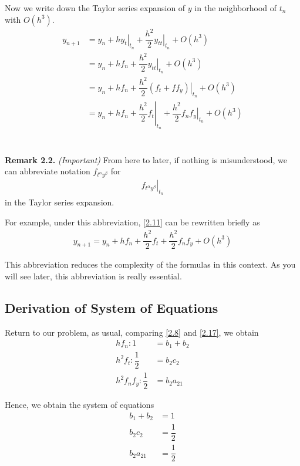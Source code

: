 \documentclass[a4paper,oneside]{book}
\numberwithin{equation}{chapter}
\begin{document}
Now we write down the Taylor series expansion of $y$ in the neighborhood of $t_n$ with $O\left(h^3\right)$.
\begin{align}
{{y_{n + 1}}} &= {{y_n}} + h{\left. {{y_t}} \right|_{{t_n}}} + \dfrac{{{h^2}}}{2}{\left. {{y_{tt}}} \right|_{{t_n}}} + O\left( {{h^3}} \right)\\
 &= {{y_n}} + h{f_n} + \dfrac{{{h^2}}}{2}{\left. {{y_{tt}}} \right|_{{t_n}}} + O\left( {{h^3}} \right)\\
 &= {{y_n}} + h{f_n} + \dfrac{{{h^2}}}{2}{\left. {\left( {{f_t} + f{f_y}} \right)} \right|_{{t_n}}} + O\left( {{h^3}} \right)\\
 &= {{y_n}} + h{f_n} + {\left. {\dfrac{{{h^2}}}{2}{f_t}} \right|_{{t_n}}} + \dfrac{{{h^2}}}{2}{f_n}{\left. {{f_y}} \right|_{{t_n}}} + O\left( {{h^3}} \right)
\label{2.11}
\end{align}\\
\\
\textbf{Remark 2.2.} \textit{(Important)} From here to later, if nothing is misunderstood, we can abbreviate notation ${f_{{t^\alpha }{y^\beta }}}$ for 
\begin{align}
{\left. {{f_{{t^\alpha }{y^\beta }}}} \right|_{{t_n}}}
\end{align}
in the Taylor series expansion.

For example, under this abbreviation, \eqref{2.11} can be rewritten briefly as
\begin{align}
\label{2.17}
{{y_{n + 1}}} = {{y_n}} + h{f_n} + \dfrac{{{h^2}}}{2}{f_t} + \dfrac{{{h^2}}}{2}{f_n}{f_y} + O\left( {{h^3}} \right)
\end{align}

This abbreviation reduces the complexity of the formulas in this context. As you will see later, this abbreviation is really essential.
\subsection{Derivation of System of Equations}
Return to our problem, as usual, comparing \eqref{2.8} and \eqref{2.17}, we obtain
\begin{align}
h{f_n}:1 &= {b_1} + {b_2}\\
{h^2}{f_t}:\dfrac{1}{2} &= {b_2}{c_2}\\
{h^2}{f_n}{f_y}:\dfrac{1}{2} &= {b_2}{a_{21}}
\end{align}

Hence, we obtain the system of equations
\begin{align}
{b_1} + {b_2} &= 1\label{2.21}\\
{b_2}{c_2} &= \dfrac{1}{2}\label{2.22}\\
{b_2}{a_{21}} &= \dfrac{1}{2}\label{2.23}
\end{align}
\end{document}
